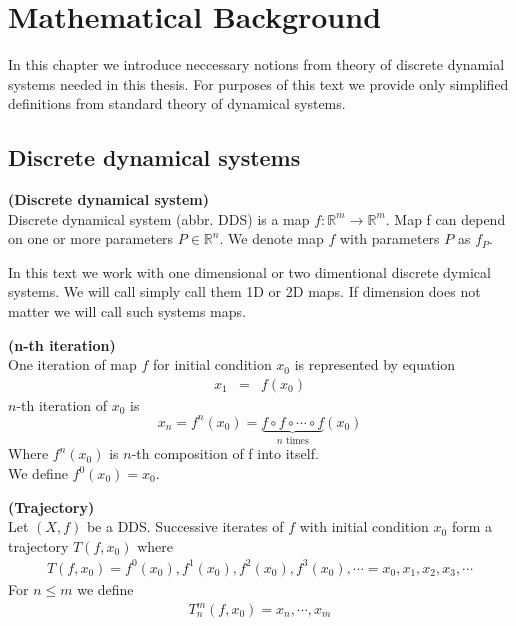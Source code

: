 \chapter{Mathematical Background}
In this chapter we introduce neccessary notions from theory of discrete dynamial systems needed in this thesis.
For purposes of this text we provide only simplified definitions from standard theory of dynamical systems.

\section{Discrete dynamical systems}

\begin{definition} \textbf{(Discrete dynamical system)} \\
    Discrete dynamical system (abbr. DDS) is a map $f: \mathbb{R}^{m} \rightarrow \mathbb{R}^{m}$.
    Map f can depend on one or more parameters $P \in \mathbb{R}^n$.
    We denote map $f$ with parameters $P$ as $f_P$.
\end{definition}

\begin{remark}
    In this text we work with one dimensional or two dimentional discrete dymical systems.
    We will call simply call them 1D or 2D maps.
    If dimension does not matter we will call such systems maps.
\end{remark}

\begin{definition} \textbf{(n-th iteration)} \\
    One iteration of map $f$ for initial condition $x_0$ is represented by equation
    \begin{eqnarray}
        x_{1}  & = & f(x_{0})
    \end{eqnarray}
    $n$-th iteration of $x_0$ is
    \begin{equation}
        x_{n} = f^{n}(x_0) = \underbrace{f \circ f \circ \cdots \circ f}_\text{$n$ times}(x_0)
    \end{equation}
    Where $f^{n}(x_0)$ is $n$-th composition of f into itself. \\
    We define $f^{0}(x_0) = x_0$.
\end{definition}

\begin{definition} \textbf{(Trajectory)} \\
    Let $(X, f)$ be a DDS. 
    Successive iterates of $f$ with initial condition $x_0$ form a trajectory $T(f, x_0)$ where
    \begin{eqnarray}
        T(f, x_0) = f^0(x_0), f^1(x_0), f^2(x_0), f^3(x_0), \cdots  = x_0, x_1, x_2, x_3, \cdots
    \end{eqnarray}
    For $n \leq m$ we define
    \begin{eqnarray}
        T_{n}^{m}(f, x_0) = x_n, \cdots, x_m
    \end{eqnarray}
\end{definition}

